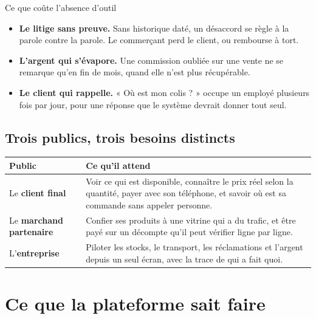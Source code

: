 \documentclass[11pt,a4paper]{article}
\begin{document}
\begin{encadre}{Ce que coûte l'absence d'outil}
\begin{itemize}
  \item \textbf{Le litige sans preuve.} Sans historique daté, un désaccord se
        règle à la parole contre la parole. Le commerçant perd le client, ou
        rembourse à tort.
  \item \textbf{L'argent qui s'évapore.} Une commission oubliée sur une vente
        ne se remarque qu'en fin de mois, quand elle n'est plus récupérable.
  \item \textbf{Le client qui rappelle.} « Où est mon colis ? » occupe un
        employé plusieurs fois par jour, pour une réponse que le système
        devrait donner tout seul.
\end{itemize}
\end{encadre}

\subsection{Trois publics, trois besoins distincts}

\begin{center}
\begin{tabularx}{\textwidth}{@{}l>{\raggedright\arraybackslash}X@{}}
\toprule
\textbf{Public} & \textbf{Ce qu'il attend} \\
\midrule
Le \textbf{client final} &
Voir ce qui est disponible, connaître le prix réel selon la quantité, payer
avec son téléphone, et savoir où est sa commande sans appeler personne. \\
\addlinespace
Le \textbf{marchand partenaire} &
Confier ses produits à une vitrine qui a du trafic, et être payé sur un
décompte qu'il peut vérifier ligne par ligne. \\
\addlinespace
L'\textbf{entreprise} &
Piloter les stocks, le transport, les réclamations et l'argent depuis un
seul écran, avec la trace de qui a fait quoi. \\
\bottomrule
\end{tabularx}
\end{center}

\newpage
\section{Ce que la plateforme sait faire}
\end{document}
